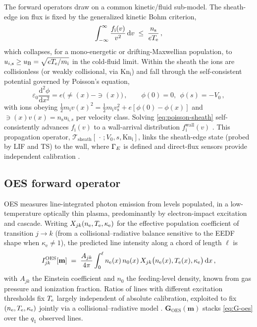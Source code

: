 The forward operators draw on a common kinetic/fluid sub-model. The sheath-edge ion flux is fixed by the generalized kinetic Bohm criterion,
\begin{equation}
\int_{-\infty}^{\infty} \frac{f_{\mathrm i}(v)}{v^{2}}\,\mathrm dv \;\le\; \frac{n_{\mathrm s}}{eT_{\mathrm{e}}}\, , \label{eq:bohm-kinetic}
\end{equation}
which collapses, for a mono-energetic or drifting-Maxwellian population, to $u_{i,\mathrm s}\ge u_{\mathrm{B}}=\sqrt{eT_{\mathrm{e}}/m_{\mathrm i}}$ in the cold-fluid limit. Within the sheath the ions are collisionless (or weakly collisional, via $\mathrm{Kn}_{\mathrm i}$) and fall through the self-consistent potential governed by Poisson's equation,
\begin{equation}
\varepsilon_{0}\frac{\mathrm d^{2}\phi}{\mathrm dx^{2}} = e\big(\ne(x)-\ni(x)\big)\, ,\qquad \phi(0)=0,\ \ \phi(s)=-V_{0}\, , \label{eq:poisson-sheath}
\end{equation}
with ions obeying $\tfrac12 m_{\mathrm i}v(x)^{2} = \tfrac12 m_{\mathrm i}v_{\mathrm s}^{2} + e[\phi(0)-\phi(x)]$ and $\ni(x)v(x)=n_{\mathrm s}u_{\mathrm i,s}$ per velocity class. Solving \cref{eq:poisson-sheath} self-consistently advances $f_{\mathrm i}(v)$ to a wall-arrival distribution $f_{\mathrm i}^{\mathrm{wall}}(v)$ \cite{ref0083,ref0672}. This propagation operator, $\mathcal T_{\mathrm{sheath}}[\,\cdot\,;V_{0},s,\mathrm{Kn}_{\mathrm i}]$, links the sheath-edge state (probed by LIF and TS) to the wall, where $\Gamma_{E}$ is defined and direct-flux sensors provide independent calibration \cite{ref0075}.

\subsection{OES forward operator}

OES measures line-integrated photon emission from levels populated, in a low-temperature optically thin plasma, predominantly by electron-impact excitation and cascade. Writing $X_{jk}(n_{\mathrm{e}},T_{\mathrm{e}},\kappa_{\mathrm e})$ for the effective population coefficient of transition $j\!\to\! k$ (from a collisional--radiative balance sensitive to the EEDF shape when $\kappa_{\mathrm e}\ne1$), the predicted line intensity along a chord of length $\ell$ is
\begin{equation}
I^{\mathrm{OES}}_{jk}[\mathbf m] \;=\; \frac{A_{jk}}{4\pi}\int_{0}^{\ell} n_{\mathrm{e}}(x)\, n_{0}(x)\, X_{jk}\big(n_{\mathrm{e}}(x),T_{\mathrm{e}}(x),\kappa_{\mathrm e}\big)\,\mathrm dx \, , \label{eq:G-oes}
\end{equation}
with $A_{jk}$ the Einstein coefficient and $n_{0}$ the feeding-level density, known from gas pressure and ionization fraction. Ratios of lines with different excitation thresholds fix $T_{\mathrm{e}}$ largely independent of absolute calibration, exploited to fix $(n_{\mathrm{e}},T_{\mathrm{e}},\kappa_{\mathrm e})$ jointly via a collisional--radiative model \cite{ref0275}. $\mathbf G_{\mathrm{OES}}(\mathbf m)$ stacks \cref{eq:G-oes} over the $q_{1}$ observed lines.

